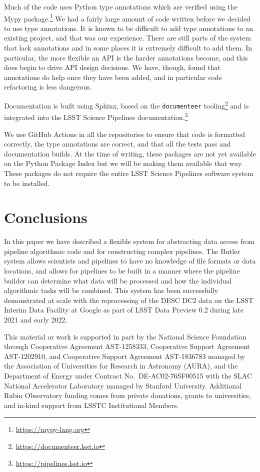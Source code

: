 \documentclass[]{spie}
\begin{document}
Much of the code uses Python type annotations which are verified using the Mypy package.\footnote{\url{https://mypy-lang.org}}
We had a fairly large amount of code written before we decided to use type annotations.
It is known to be difficult to add type annotations to an existing project\cite{10.1109/ASE51524.2021.9678947}, and that was our experience.
There are still parts of the system that lack annotations and in some places it is extremely difficult to add them.
In particular, the more flexible an API is the harder annotations become, and this does begin to drive API design decisions.
We have, though, found that annotations do help once they have been added, and in particular code refactoring is less dangerous.

Documentation is built using Sphinx, based on the \texttt{documenteer} tooling\footnote{\url{https://documenteer.lsst.io}} and is integrated into the LSST Science Pipelines documentation.\footnote{\url{https://pipelines.lsst.io}}

We use GitHub Actions in all the repositories to ensure that code is formatted correctly, the type annotations are correct, and that all the tests pass and documentation builds.
At the time of writing, these packages are not yet available on the Python Package Index but we will be making them available that way.
These packages do not require the entire LSST Science Pipelines software system to be installed.

\section{Conclusions}

In this paper we have described a flexible system for abstracting data access from pipeline algorithmic code and for constructing complex pipelines.
The Butler system allows scientists and pipelines to have no knowledge of file formats or data locations, and allows for pipelines to be built in a manner where the pipeline builder can determine what data will be processed and how the individual algorithmic tasks will be combined.
This system has been successfully demonstrated at scale with the reprocessing of the DESC DC2 data\cite{2021ApJS..253...31L} on the LSST Interim Data Facility at Google \cite{2021arXiv211115030O} as part of LSST Data Preview 0.2 \cite{RTN-001} during late 2021 and early 2022.


\acknowledgments

This material or work is supported in part by the National Science Foundation through Cooperative Agreement AST-1258333, Cooperative Support Agreement AST-1202910, and Cooperative Support Agreement AST-1836783 managed by the Association of Universities for Research in Astronomy (AURA), and the Department of Energy under Contract No.\ DE-AC02-76SF00515 with the SLAC National Accelerator Laboratory managed by Stanford University.
Additional Rubin Observatory funding comes from private donations, grants to universities, and in-kind support from LSSTC Institutional Members.



\end{document}
